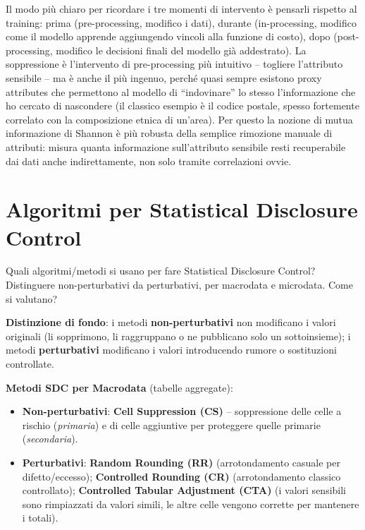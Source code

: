 \documentclass[a4paper,11pt]{article}
\begin{document}
\begin{nota}
Il modo pi\`{u} chiaro per ricordare i tre momenti di intervento \`{e} pensarli rispetto al training: prima (pre-processing, modifico i dati), durante (in-processing, modifico come il modello apprende aggiungendo vincoli alla funzione di costo), dopo (post-processing, modifico le decisioni finali del modello gi\`{a} addestrato). La soppressione \`{e} l'intervento di pre-processing pi\`{u} intuitivo -- togliere l'attributo sensibile -- ma \`{e} anche il pi\`{u} ingenuo, perch\'{e} quasi sempre esistono proxy attributes che permettono al modello di ``indovinare'' lo stesso l'informazione che ho cercato di nascondere (il classico esempio \`{e} il codice postale, spesso fortemente correlato con la composizione etnica di un'area). Per questo la nozione di mutua informazione di Shannon \`{e} pi\`{u} robusta della semplice rimozione manuale di attributi: misura quanta informazione sull'attributo sensibile resti recuperabile dai dati anche indirettamente, non solo tramite correlazioni ovvie.
\end{nota}

\section{Algoritmi per Statistical Disclosure Control}

\begin{domanda}
Quali algoritmi/metodi si usano per fare Statistical Disclosure Control? Distinguere non-perturbativi da perturbativi, per macrodata e microdata. Come si valutano?
\end{domanda}

\textbf{Distinzione di fondo}: i metodi \textbf{non-perturbativi} non modificano i valori originali (li sopprimono, li raggruppano o ne pubblicano solo un sottoinsieme); i metodi \textbf{perturbativi} modificano i valori introducendo rumore o sostituzioni controllate.

\textbf{Metodi SDC per Macrodata} (tabelle aggregate):
\begin{itemize}
  \item \textbf{Non-perturbativi}: \textbf{Cell Suppression (CS)} -- soppressione delle celle a rischio (\emph{primaria}) e di celle aggiuntive per proteggere quelle primarie (\emph{secondaria}).
  \item \textbf{Perturbativi}: \textbf{Random Rounding (RR)} (arrotondamento casuale per difetto/eccesso); \textbf{Controlled Rounding (CR)} (arrotondamento classico controllato); \textbf{Controlled Tabular Adjustment (CTA)} (i valori sensibili sono rimpiazzati da valori simili, le altre celle vengono corrette per mantenere i totali).
\end{itemize}
\end{document}
